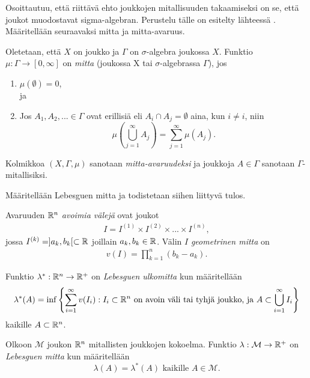 \documentclass[12pt,oneside,a4paper]{amsbook} %
\begin{document}
Osoittautuu, että riittävä ehto joukkojen mitallisuuden takaamiseksi on se, että joukot muodostavat sigma-algebran. Perustelu tälle on esitelty lähteessä \cite{tao}. Määritellään seuraavaksi mitta ja mitta-avaruus.

\begin{definition}
    Oletetaan, että $X$ on joukko ja $\Gamma$ on $\sigma$-algebra joukossa $X$. Funktio $\mu : \Gamma \to [0, \infty]$ on \textit{mitta} (joukossa X tai $\sigma$-algebrassa $\Gamma$), jos 
    \begin{enumerate}
        \item $\mu(\emptyset) = 0$, \\
        ja
        \item Jos $A_1, A_2, ... \in \Gamma$ ovat erillisiä eli $A_i \cap A_j = \emptyset$ aina, kun $i \ne i$, niin
        $$\mu\left(\bigcup_{j=1}^\infty A_j \right) = \sum_{j=1}^\infty \mu(A_j).$$
    \end{enumerate}
    
    Kolmikkoa $(X,\Gamma, \mu)$ sanotaan \textit{mitta-avaruudeksi} ja joukkoja $A\in \Gamma$ sanotaan $\Gamma$-mitallisiksi.
    
\end{definition}

Määritellään Lebesguen mitta ja todistetaan siihen liittyvä tulos.

\begin{definition}
    Avaruuden $\mathbb{R}^n$ \textit{avoimia välejä} ovat joukot
    \begin{align*}
        I = I^{(1)} \times I^{(2)} \times ... \times I^{(n)},
    \end{align*}
    jossa $I^{(k)} = ]a_k, b_k[ \subset \mathbb{R}$ joillain $a_k, b_k \in \mathbb{R}$.
    Välin $I$ \textit{geometrinen mitta} on
    \begin{align*}
        v(I) = \prod_{k=1}^n(b_k-a_k).
    \end{align*}
\end{definition}

\begin{definition}
    Funktio $\lambda^* : \mathbb{R}^n \to \mathbb{R}^+$ on \textit{Lebesguen ulkomitta} kun määritellään
    $$\lambda^*(A) = \inf\left\{\sum_{i=1}^\infty v(I_i) : I_i \subset \mathbb{R}^n \text{ on avoin väli tai tyhjä joukko, ja } A \subset \bigcup_{i=1}^{\infty}I_i\right\}$$
    kaikille $A \subset \mathbb{R}^n$.
\end{definition}

\begin{definition}
    Olkoon $\mathcal M$ joukon $\mathbb{R}^n$ mitallisten joukkojen kokoelma. Funktio $\lambda : \mathcal M \to \mathbb{R}^+$ on \textit{Lebesguen mitta} kun määritellään
    $$\lambda(A) = \lambda^*(A) \text{ kaikille } A \in \mathcal M.$$
\end{definition}
\end{document}
